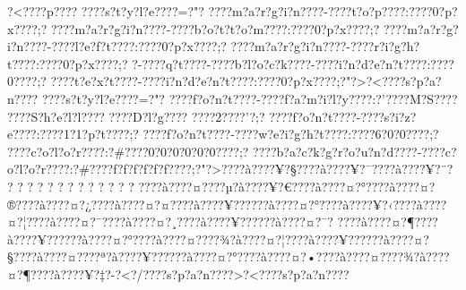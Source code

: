 \documentclass[11pt, openany]{book}
\begin{document}
?\textless{}???\textbar{}?p???\textbar{}?
???\textbar{}?s?t?y?l?e???\textbar{}?=?"?
???\textbar{}?m?a?r?g?i?n???\textbar{}?-???\textbar{}?t?o?p???\textbar{}?:???\textbar{}?0?p?x???\textbar{}?;?
???\textbar{}?m?a?r?g?i?n???\textbar{}?-???\textbar{}?b?o?t?t?o?m???\textbar{}?:???\textbar{}?0?p?x???\textbar{}?;?
???\textbar{}?m?a?r?g?i?n???\textbar{}?-???\textbar{}?l?e?f?t???\textbar{}?:???\textbar{}?0?p?x???\textbar{}?;?
???\textbar{}?m?a?r?g?i?n???\textbar{}?-???\textbar{}?r?i?g?h?t???\textbar{}?:???\textbar{}?0?p?x???\textbar{}?;?
?-???\textbar{}?q?t???\textbar{}?-???\textbar{}?b?l?o?c?k???\textbar{}?-???\textbar{}?i?n?d?e?n?t???\textbar{}?:???\textbar{}?0???\textbar{}?;?
???\textbar{}?t?e?x?t???\textbar{}?-???\textbar{}?i?n?d?e?n?t???\textbar{}?:???\textbar{}?0?p?x???\textbar{}?;?"?\textgreater{}?\textless{}???\textbar{}?s?p?a?n???\textbar{}?
???\textbar{}?s?t?y?l?e???\textbar{}?=?"?
???\textbar{}?f?o?n?t???\textbar{}?-???\textbar{}?f?a?m?i?l?y???\textbar{}?:?'???\textbar{}?M?S???\textbar{}?
???\textbar{}?S?h?e?l?l???\textbar{}? ???\textbar{}?D?l?g???\textbar{}?
???\textbar{}?2???\textbar{}?'?;?
???\textbar{}?f?o?n?t???\textbar{}?-???\textbar{}?s?i?z?e???\textbar{}?:???\textbar{}?1?1?p?t???\textbar{}?;?
???\textbar{}?f?o?n?t???\textbar{}?-???\textbar{}?w?e?i?g?h?t???\textbar{}?:???\textbar{}?6?0?0???\textbar{}?;?
???\textbar{}?c?o?l?o?r???\textbar{}?:?\#???\textbar{}?0?0?0?0?0?0???\textbar{}?;?
???\textbar{}?b?a?c?k?g?r?o?u?n?d???\textbar{}?-???\textbar{}?c?o?l?o?r???\textbar{}?:?\#???\textbar{}?f?f?f?f?f?f???\textbar{}?;?"?\textgreater{}???\textbar{}?à???\textbar{}?¥?§???\textbar{}?à???\textbar{}?¥?¯???\textbar{}?à???\textbar{}?¥?¨?
? ? ? ? ? ? ? ? ? ? ? ? ?
???\textbar{}?à???\textbar{}?¤???\textbar{}?µ?à???\textbar{}?¥?€???\textbar{}?à???\textbar{}?¤?°???\textbar{}?à???\textbar{}?¤?®???\textbar{}?à???\textbar{}?¤?¿???\textbar{}?à???\textbar{}?¤?¤???\textbar{}?à???\textbar{}?¥?????\textbar{}?à???\textbar{}?¤?°???\textbar{}?à???\textbar{}?¥?‹???\textbar{}?à???\textbar{}?¤?¦???\textbar{}?à???\textbar{}?¤?¯???\textbar{}?à???\textbar{}?¤?¸???\textbar{}?à???\textbar{}?¥?????\textbar{}?à???\textbar{}?¤?¯?
???\textbar{}?à???\textbar{}?¤?¶???\textbar{}?à???\textbar{}?¥?????\textbar{}?à???\textbar{}?¤?°???\textbar{}?à???\textbar{}?¤???\textbar{}?¾?à???\textbar{}?¤?¦???\textbar{}?à???\textbar{}?¥?????\textbar{}?à???\textbar{}?¤?§???\textbar{}?à???\textbar{}?¤???\textbar{}?ª?à???\textbar{}?¥?????\textbar{}?à???\textbar{}?¤?°???\textbar{}?à???\textbar{}?¤?•???\textbar{}?à???\textbar{}?¤???\textbar{}?¾?à???\textbar{}?¤?¶???\textbar{}?à???\textbar{}?¥?‡?-?\textless{}?/???\textbar{}?s?p?a?n???\textbar{}?\textgreater{}?\textless{}???\textbar{}?s?p?a?n???\textbar{}?
\end{document}
